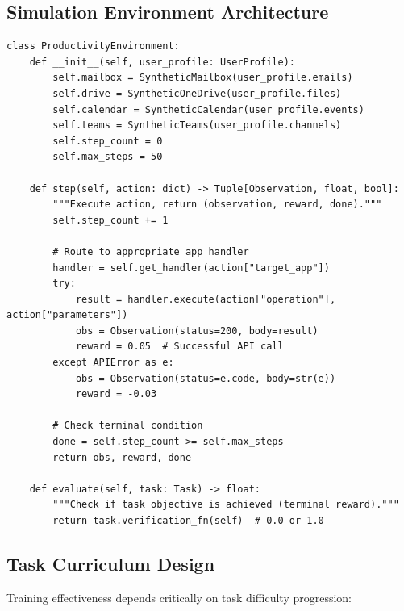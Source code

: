 \subsection{Simulation Environment Architecture}
\label{simulation-environment-architecture}

\begin{examplebox}
\begin{lstlisting}[style=pythonstyle]
class ProductivityEnvironment:
    def __init__(self, user_profile: UserProfile):
        self.mailbox = SyntheticMailbox(user_profile.emails)
        self.drive = SyntheticOneDrive(user_profile.files)
        self.calendar = SyntheticCalendar(user_profile.events)
        self.teams = SyntheticTeams(user_profile.channels)
        self.step_count = 0
        self.max_steps = 50
        
    def step(self, action: dict) -> Tuple[Observation, float, bool]:
        """Execute action, return (observation, reward, done)."""
        self.step_count += 1
        
        # Route to appropriate app handler
        handler = self.get_handler(action["target_app"])
        try:
            result = handler.execute(action["operation"], action["parameters"])
            obs = Observation(status=200, body=result)
            reward = 0.05  # Successful API call
        except APIError as e:
            obs = Observation(status=e.code, body=str(e))
            reward = -0.03
            
        # Check terminal condition
        done = self.step_count >= self.max_steps
        return obs, reward, done
    
    def evaluate(self, task: Task) -> float:
        """Check if task objective is achieved (terminal reward)."""
        return task.verification_fn(self)  # 0.0 or 1.0
\end{lstlisting}
\end{examplebox}

\subsection{Task Curriculum Design}
\label{task-curriculum-design}

Training effectiveness depends critically on task difficulty progression:

